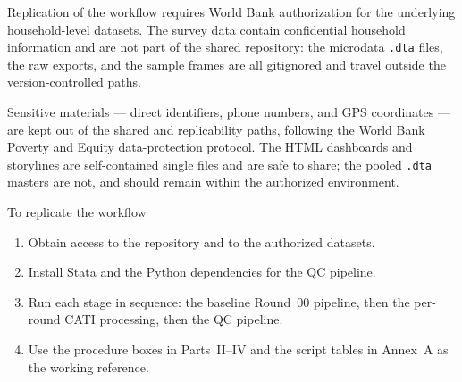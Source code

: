 

Replication of the workflow requires World Bank authorization for the underlying
household-level datasets. The survey data contain confidential household
information and are not part of the shared repository: the microdata
\texttt{.dta} files, the raw exports, and the sample frames are all gitignored
and travel outside the version-controlled paths.

Sensitive materials --- direct identifiers, phone numbers, and GPS coordinates
--- are kept out of the shared and replicability paths, following the World Bank
Poverty and Equity data-protection protocol. The HTML dashboards and storylines
are self-contained single files and are safe to share; the pooled \texttt{.dta}
masters are not, and should remain within the authorized environment.

\begin{procbox}{To replicate the workflow}
\begin{enumerate}[leftmargin=1.4em,itemsep=0.2em]
  \item Obtain access to the repository and to the authorized datasets.
  \item Install Stata and the Python dependencies for the QC pipeline.
  \item Run each stage in sequence: the baseline Round~00 pipeline, then the
        per-round CATI processing, then the QC pipeline.
  \item Use the procedure boxes in Parts~II--IV and the script tables in
        Annex~A as the working reference.
\end{enumerate}
\end{procbox}
